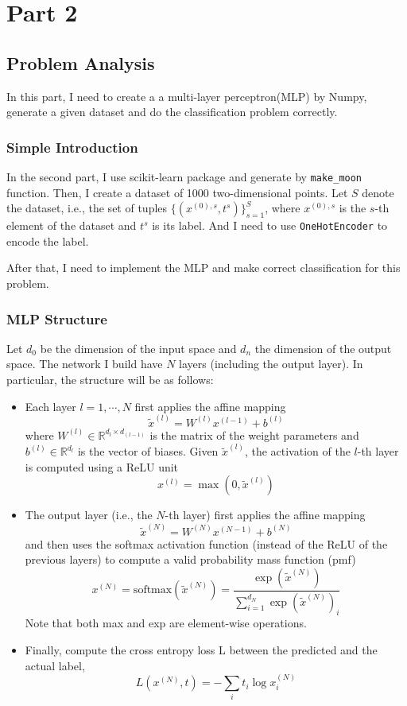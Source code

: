 \section{Part 2}


\subsection{Problem Analysis}

In this part, I need to create a a multi-layer perceptron(MLP) by Numpy, generate a given dataset and do the classification problem correctly.

\subsubsection{Simple Introduction}

In the second part, I use scikit-learn package and generate by \texttt{make\_moon} function.
Then, I create a dataset of 1000 two-dimensional points.
Let $S$ denote the dataset, i.e., the set of tuples $\{(x^{(0),s}, t^{s})\}_{s=1}^{S}$, where $x^{(0),s}$ is the $s$-th element of the dataset and $t^{s}$ is its label.
And I need to use \texttt{OneHotEncoder} to encode the label.

After that, I need to implement the MLP and make correct classification for this problem.

\subsubsection{MLP Structure}

Let $d_{0}$ be the dimension of the input space and $d_{n}$ the dimension of the output space.
The network I build have $N$ layers (including the output layer).
In particular, the structure will be as follows:

\begin{itemize}
  \item {Each layer $l = 1, \cdots , N$ first applies the affine mapping
      $$
      \tilde{x}^{(l)} = W^{(l)}x^{(l-1)}+b^{(l)}
      $$
      where $W^{(l)} \in \mathbb{R}^{d_{l}\times d_{(l-1)}}$ is the matrix of the weight parameters and $b^{(l)} \in \mathbb{R}^{d_{l}}$ is the vector of biases.
      Given $\tilde{x}^{(l)}$, the activation of the $l$-th layer is computed using a ReLU unit
      $$
      x^{(l)} = \max(0,\tilde{x}^{(l)})
      $$
    }
  \item {The output layer (i.e., the $N$-th layer) first applies the affine mapping
      $$
      \tilde{x}^{(N)} = W^{(N)}x^{(N-1)} + b^{(N)}
      $$
      and then uses the softmax activation function (instead of the ReLU of the previous layers) to compute a valid probability mass function (pmf)
      $$
      x^{(N)} = \text{softmax}(\tilde{x}^{(N)}) = \frac{\exp(\tilde{x}^{(N)})}{\sum_{i=1}^{d_{N}}\exp(\tilde{x}^{(N)})_{i}}
      $$
      Note that both max and exp are element-wise operations.
    }
  \item {Finally, compute the cross entropy loss L between the predicted and the actual label,
      $$
      L(x^{(N)},t) = -\sum_{i}t_{i}\log{x_{i}^{(N)}}
      $$
    }
\end{itemize}

